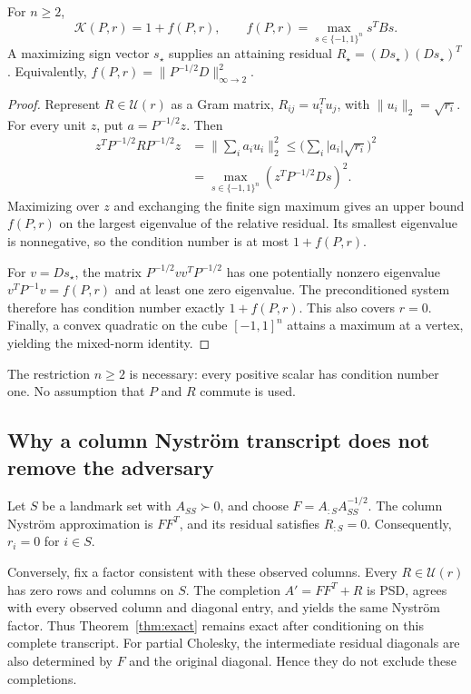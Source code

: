 \documentclass[final,leqno,letterpaper]{etna}
\newcommand{\opt}{\mathcal K}
\begin{document}
\begin{theorem}\label{thm:exact}
For $n\ge2$,
\begin{equation*}
 \opt(P,r)=1+f(P,r),\qquad
 f(P,r)=\max_{s\in\{-1,1\}^n}s^TBs.
\end{equation*}
A maximizing sign vector $s_\star$ supplies an attaining residual
$R_\star=(Ds_\star)(Ds_\star)^T$. Equivalently,
$f(P,r)=\|P^{-1/2}D\|_{\infty\to2}^2$.
\end{theorem}
\begin{proof}
Represent $R\in\mathcal U(r)$ as a Gram matrix, $R_{ij}=u_i^Tu_j$, with $\|u_i\|_2=\sqrt{r_i}$. For every unit $z$, put $a=P^{-1/2}z$. Then
\begin{align*}
 z^TP^{-1/2}RP^{-1/2}z
 &=\Big\|\sum_i a_i u_i\Big\|_2^2
 \le\Big(\sum_i |a_i|\sqrt{r_i}\Big)^2\\
 &=\max_{s\in\{-1,1\}^n}(z^TP^{-1/2}Ds)^2.
\end{align*}
Maximizing over $z$ and exchanging the finite sign maximum gives an upper bound $f(P,r)$ on the largest eigenvalue of the relative residual. Its smallest eigenvalue is nonnegative, so the condition number is at most $1+f(P,r)$.

For $v=Ds_\star$, the matrix $P^{-1/2}vv^TP^{-1/2}$ has one potentially nonzero eigenvalue $v^TP^{-1}v=f(P,r)$ and at least one zero eigenvalue. The preconditioned system therefore has condition number exactly $1+f(P,r)$. This also covers $r=0$. Finally, a convex quadratic on the cube $[-1,1]^n$ attains a maximum at a vertex, yielding the mixed-norm identity.
\end{proof}
The restriction $n\ge2$ is necessary: every positive scalar has condition number one. No assumption that $P$ and $R$ commute is used.

\subsection{Why a column Nystr\"om transcript does not remove the adversary}
Let $S$ be a landmark set with $A_{SS}\succ0$, and choose $F=A_{:S}A_{SS}^{-1/2}$. The column Nystr\"om approximation is $FF^T$, and its residual satisfies $R_{:S}=0$. Consequently, $r_i=0$ for $i\in S$.

Conversely, fix a factor consistent with these observed columns. Every $R\in\mathcal U(r)$ has zero rows and columns on $S$. The completion $A'=FF^T+R$ is PSD, agrees with every observed column and diagonal entry, and yields the same Nystr\"om factor. Thus Theorem~\ref{thm:exact} remains exact after conditioning on this complete transcript. For partial Cholesky, the intermediate residual diagonals are also determined by $F$ and the original diagonal. Hence they do not exclude these completions.
\end{document}
